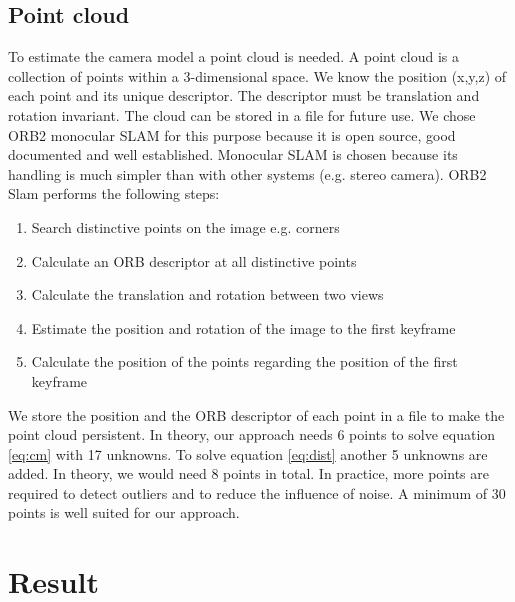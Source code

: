 \documentclass[11pt,a4paper,titlepage,oneside]{report}
\begin{document}
\section{Point cloud}
To estimate the camera model a point cloud is needed. A point cloud is a collection of points within a 3-dimensional space. We know the position (x,y,z) of each point and its unique descriptor. The descriptor must be translation and rotation invariant. The cloud can be stored in a file for future use. We chose ORB2 monocular SLAM \cite{orbslam} for this purpose because it is open source, good documented and well established. Monocular SLAM is chosen because its handling is much simpler than with other systems (e.g. stereo camera). ORB2 Slam performs the following steps:
\begin{enumerate}
\item Search distinctive points on the image e.g. corners
\item Calculate an ORB descriptor at all distinctive points
\item Calculate the translation and rotation between two views
\item Estimate the position and rotation of the image to the first keyframe
\item Calculate the position of the points regarding the position of the first keyframe
\end{enumerate}
We store the position and the ORB descriptor of each point in a file to make the point cloud persistent.
In theory, our approach needs 6 points to solve equation \ref{eq:cm} with 17 unknowns. To solve equation \ref{eq:dist} another 5 unknowns are added. In theory, we would need 8 points in total. In practice, more points are required to detect outliers and to reduce the influence of noise. A minimum of 30 points is well suited for our approach.

\chapter{Result}
\end{document}
